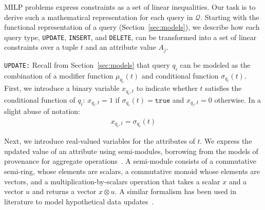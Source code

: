
MILP problems express constraints as a set of linear inequalities. Our
task is to derive such a mathematical representation for each query in
$\mathcal{Q}$. Starting with the functional representation of a
query (Section~\ref{sec:models}), we describe how each query type,
\texttt{UPDATE}, \texttt{INSERT}, and \texttt{DELETE}, can be
transformed into a set of linear constraints over a tuple $t$ and an
attribute value $A_j$.



\smallskip
\noindent
\texttt{UPDATE:}
Recall from Section~\ref{sec:models} that query $q_i$ can be modeled
as the combination of a modifier function $\mu_{q_i}(t)$ and
conditional function $\sigma_{q_i}(t)$. First, we introduce a binary
variable $x_{q_i, t}$ to indicate whether $t$ satisfies the
conditional function of $q_i$: $x_{q_i, t}=1$ if
$\sigma_{q_i}(t)=\texttt{true}$ and $x_{q_i, t}=0$ otherwise. In a
slight abuse of notation:
% 
\begin{align}
\label{eq:x}
x_{q_i, t} = \sigma_{q_i}(t)
\end{align}
 

Next, we introduce real-valued variables for the attributes of $t$.
We express the updated value
of an attribute using semi-modules, borrowing from the models of
provenance for aggregate operations~\cite{Amsterdamer2011}. A
semi-module consists of a commutative semi-ring, whose elements are
scalars, a commutative monoid whose elements are vectors, and a
multiplication-by-scalars operation that takes a scalar $x$ and a
vector $u$ and returns a vector $x \otimes u$. A similar formalism has
been used in literature to model hypothetical data
updates~\cite{tiresias}.

